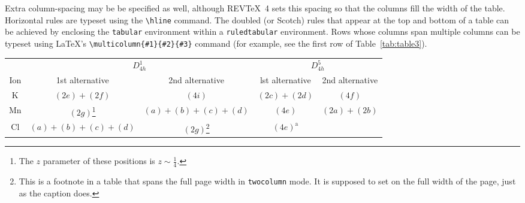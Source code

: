 \documentclass[%
 aip,
 jmp,%
 amsmath,amssymb,
preprint,%
 reprint,%
]{revtex4-2}
\begin{document}
Extra column-spacing may be be specified as well, although
REV\TeX~4 sets this spacing so that the columns fill the width of the
table.
Horizontal rules are typeset using the \verb+\hline+
command.
The doubled (or Scotch) rules that appear at the top and
bottom of a table can be achieved by enclosing the \texttt{tabular}
environment within a \texttt{ruledtabular} environment.
Rows whose columns span multiple columns can be typeset using \LaTeX's
\verb+\multicolumn{#1}{#2}{#3}+ command
(for example, see the first row of Table~\ref{tab:table3}).%
\begin{table*}
  \caption{\label{tab:table3}This is a wide table that spans the page
    width in \texttt{twocolumn} mode. It is formatted using the
    \texttt{table*} environment. It also demonstrates the use of
    \textbackslash\texttt{multicolumn} in rows with entries that span
    more than one column.}
  \begin{ruledtabular}
    \begin{tabular}{ccccc}
          & \multicolumn{2}{c}{$D_{4h}^1$}                                               & \multicolumn{2}{c}{$D_{4h}^5$}                                                                                 \\
      Ion & 1st alternative                                                              & 2nd alternative                                                        & lst alternative
          & 2nd alternative                                                                                                                                                                               \\ \hline
      K   & $(2e)+(2f)$                                                                  & $(4i)$                                                                 & $(2c)+(2d)$       & $(4f)$            \\
      Mn  & $(2g)$\footnote{The $z$ parameter of these positions is $z\sim\frac{1}{4}$.}
          & $(a)+(b)+(c)+(d)$                                                            & $(4e)$                                                                 & $(2a)+(2b)$                           \\
      Cl  & $(a)+(b)+(c)+(d)$                                                            & $(2g)$\footnote{This is a footnote in a table that spans the full page
        width in \texttt{twocolumn} mode. It is supposed to set on the full width of the page, just as the caption does. }
          & $(4e)^{\text{a}}$                                                                                                                                                                             \\

\end{tabular}
\end{ruledtabular}
\end{table*}
\end{document}

